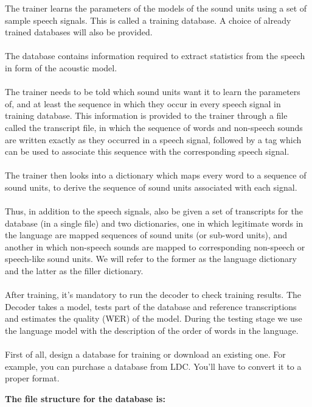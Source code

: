 \documentclass[12pt,a4paper,oneside]{memoir}
\begin{document}
The trainer learns the parameters of the models of the sound units using a set of sample speech signals. This is called a training database. A choice of already trained databases will also be provided.\\\\
The database contains information required to extract statistics from the speech in form of the acoustic model.\\\\
The trainer needs to be told which sound units want it to learn the parameters of, and at least the sequence in which they occur in every speech signal in training database. This information is provided to the trainer through a file called the transcript file, in which the sequence of words and non-speech sounds are written exactly as they occurred in a speech signal, followed by a tag which can be used to associate this sequence with the corresponding speech signal.\\\\
The trainer then looks into a dictionary which maps every word to a sequence of sound units, to derive the sequence of sound units associated with each signal.\\\\
Thus, in addition to the speech signals, also be given a set of transcripts for the database (in a single file) and two dictionaries, one in which legitimate words in the language are mapped sequences of sound units (or sub-word units), and another in which non-speech sounds are mapped to corresponding non-speech or speech-like sound units. We will refer to the former as the language dictionary and the latter as the filler dictionary.\\\\
After training, it's mandatory to run the decoder to check training results. The Decoder takes a model, tests part of the database and reference transcriptions and estimates the quality (WER) of the model. During the testing stage we use the language model with the description of the order of words in the language.\\\\
First of all, design a database for training or download an existing one. For example, you can purchase a database from LDC. You'll have to convert it to a proper format. 

\textbf{The file structure for the database is:} 
\end{document}
